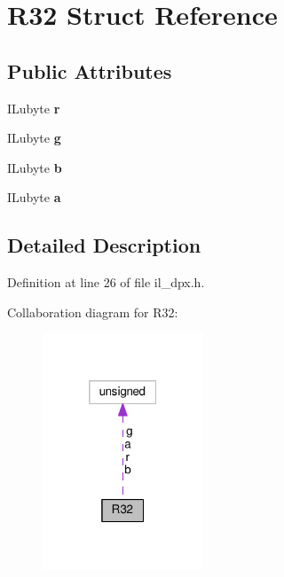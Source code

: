 \hypertarget{structR32}{}\section{R32 Struct Reference}
\label{structR32}
\subsection*{Public Attributes}
\begin{DoxyCompactItemize}
\item 
\mbox{\label{structR32_a6da0ff03dce0d2ce04eb18ddc417dae4}} 
I\+Lubyte {\bfseries r}
\item 
\mbox{\label{structR32_a927c4a9c0d65e633d72ad2acdb768c3f}} 
I\+Lubyte {\bfseries g}
\item 
\mbox{\label{structR32_a464947e51b69de6ab6070ba7d748c413}} 
I\+Lubyte {\bfseries b}
\item 
\mbox{\label{structR32_af9b9229864bdb5be6de654f86b7e31ee}} 
I\+Lubyte {\bfseries a}
\end{DoxyCompactItemize}


\subsection{Detailed Description}


Definition at line 26 of file il\+\_\+dpx.\+h.



Collaboration diagram for R32\+:
\nopagebreak
\begin{figure}[H]
\begin{center}
\leavevmode
\includegraphics[width=136pt]{d0/ddc/structR32__coll__graph}
\end{center}
\end{figure}


